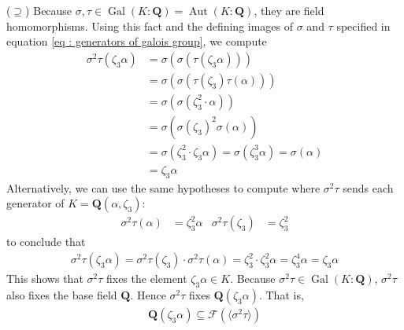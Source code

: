 \documentclass[oneside, english, 11pt]{article}
\newcommand{\fontField}[1]{\mathbf{#1}}
\newcommand{\Aut}{\automorphisms}
\DeclareMathOperator{\automorphisms}{Aut}
\newcommand{\fixedField}{\mathcal{F}}
\newcommand{\Gal}{\galoisGroup}
\DeclareMathOperator{\galoisGroup}{Gal}
\newcommand{\Q}{\rationals}
\newcommand{\rationals}{\fontField{Q}}
\begin{document}
($\supseteq$) Because $\sigma, \tau \in \Gal(K : \Q) = \Aut(K : \Q)$, they are field homomorphisms. Using this fact and the defining images of $\sigma$ and $\tau$ specified in equation \eqref{eq : generators of galois group}, we compute
\begin{align*}
\sigma^{2} \tau(\zeta_{3} \alpha)
&=
\sigma(\sigma(\tau(\zeta_{3} \alpha)))
\\
&=
\sigma(\sigma(\tau(\zeta_{3}) \tau(\alpha)))
\\
&=
\sigma(\sigma(\zeta_{3}^{2} \cdot \alpha))
\\
&=
\sigma(\sigma(\zeta_{3})^{2} \sigma(\alpha))
\\
&=
\sigma(\zeta_{3}^{2} \cdot \zeta_{3} \alpha)
=
\sigma(\zeta_{3}^{3} \alpha)
=
\sigma(\alpha)
\\
&=
\zeta_{3} \alpha
\end{align*}
Alternatively, we can use the same hypotheses to compute where $\sigma^{2} \tau$ sends each generator of $K = \Q(\alpha, \zeta_{3})$:
\begin{align}
\sigma^{2} \tau(\alpha)
&=
\zeta_{3}^{2} \alpha
&
\sigma^{2} \tau(\zeta_{3})
&=
\zeta_{3}^{2}%
\label{eq : s2t images}
\end{align}
to conclude that
\begin{align*}
\sigma^{2} \tau(\zeta_{3} \alpha)
=
\sigma^{2} \tau(\zeta_{3}) \cdot \sigma^{2} \tau(\alpha)
=
\zeta_{3}^{2} \cdot \zeta_{3}^{2} \alpha
=
\zeta_{3}^{4} \alpha
=
\zeta_{3} \alpha
\end{align*}
This shows that $\sigma^{2} \tau$ fixes the element $\zeta_{3} \alpha \in K$. Because $\sigma^{2} \tau \in \Gal(K : \Q)$, $\sigma^{2} \tau$ also fixes the base field $\Q$. Hence $\sigma^{2} \tau$ fixes $\Q(\zeta_{3} \alpha)$. That is,
\begin{align}
\Q(\zeta_{3} \alpha)
\subseteq
\fixedField(\langle{}\sigma^{2} \tau\rangle{})%
\label{eq : subfield in fixed field}
\end{align}
\end{document}
